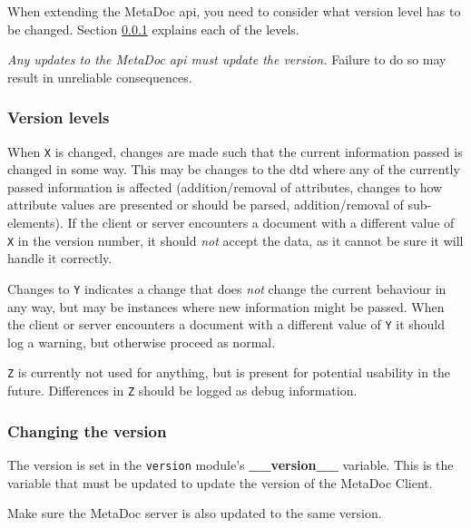 When extending the MetaDoc \gls{api}, you need to consider what version level
has to be changed. Section \ref{sec:version_levels} explains each of the
levels.

\textit{Any updates to the MetaDoc \gls{api} must update the version.} Failure
to do so may result in unreliable consequences.

\subsubsection{Version levels}
\label{sec:version_levels}
When \texttt{X} is changed, changes are made such that the current information
passed is changed in some way. This may be changes to the \gls{dtd} where any
of the currently passed information is affected (addition/removal of
attributes, changes to how attribute values are presented or should be parsed,
addition/removal of sub-elements). If the client or server encounters a
document with a different value of \texttt{X} in the version number, it should
\textit{not} accept the data, as it cannot be sure it will handle it correctly.

Changes to \texttt{Y} indicates a change that does \textit{not} change the
current behaviour in any way, but may be instances where new information might
be passed. When the client or server encounters a document with a different
value of \texttt{Y} it should log a warning, but otherwise proceed as normal.

\texttt{Z} is currently not used for anything, but is present for potential
usability in the future. Differences in \texttt{Z} should be logged as debug
information.

\subsubsection{Changing the version}
The version is set in the \texttt{version} module's \textbf{\_\_version\_\_}
variable. This is the variable that must be updated to update the version of
the MetaDoc Client.

Make sure the MetaDoc server is also updated to the same version.
